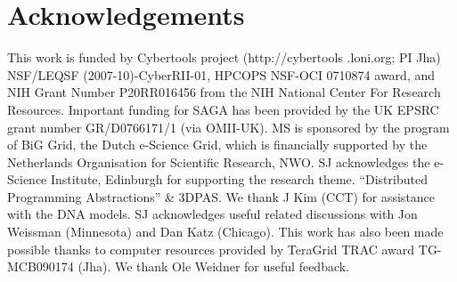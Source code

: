 \documentclass[conference,final]{IEEEtran}
\newcommand{\up}{\vspace*{-1em}}
\newcommand{\upp}{\vspace*{-0.5em}}
\begin{document}
\section*{Acknowledgements\upp\upp}
\footnotesize{This work is funded by Cybertools project
  (http://cybertools .loni.org; PI Jha) NSF/LEQSF
  (2007-10)-CyberRII-01, HPCOPS NSF-OCI 0710874 award, and NIH Grant
  Number P20RR016456 from the NIH National Center For Research
  Resources. Important funding for SAGA has been provided by the UK
  EPSRC grant number GR/D0766171/1 (via OMII-UK).  MS is sponsored by
  the program of BiG Grid, the Dutch e-Science Grid, which is
  financially supported by the Netherlands Organisation for Scientific
  Research, NWO. SJ acknowledges the e-Science Institute, Edinburgh
  for supporting the research theme. ``Distributed Programming
  Abstractions'' \& 3DPAS. We thank J Kim (CCT) for assistance with
  the DNA models.  SJ acknowledges useful related discussions with Jon
  Weissman (Minnesota) and Dan Katz (Chicago). This work has also been
  made possible thanks to computer resources provided by TeraGrid TRAC
  award TG-MCB090174 (Jha). We thank Ole Weidner for useful feedback.}

\up


\end{document}
